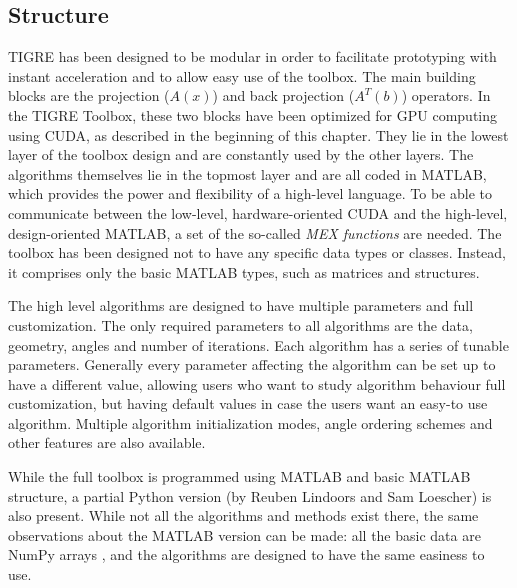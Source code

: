 \subsection{Structure}

TIGRE has been designed to be modular in order to facilitate prototyping with instant acceleration and to allow easy use of the toolbox. The main building blocks are the projection ($A(x)$) and back projection ($A^T(b)$) operators. In the TIGRE Toolbox, these two blocks have been optimized for GPU computing using CUDA, as described in the beginning of this chapter. They lie in the lowest layer of the toolbox design and are constantly used by the other layers. The algorithms themselves lie in the topmost layer and are all coded in MATLAB, which provides the power and flexibility of a high-level language. To be able to communicate between the low-level, hardware-oriented CUDA and the high-level, design-oriented MATLAB, a set of the so-called \textit{MEX functions} are needed. The toolbox has been designed not to have any specific data types or classes. Instead, it comprises only the basic MATLAB types, such as matrices and structures.

The high level algorithms are designed to have multiple parameters and full customization. The only required parameters to all algorithms are the data, geometry, angles and number of iterations. Each algorithm has a series of tunable parameters. Generally every parameter affecting the algorithm can be set up to have a different value, allowing users who want to study algorithm behaviour full customization, but having default values in case the users want an easy-to use algorithm. Multiple algorithm initialization modes, angle ordering schemes and other features are also available. 

While the full toolbox is programmed using MATLAB and basic MATLAB structure, a partial Python version (by Reuben Lindoors and Sam Loescher) is also present. While not all the algorithms and methods exist there, the same observations about the MATLAB version can be made: all the basic data are NumPy arrays , and the algorithms are designed to have the same easiness to use.

